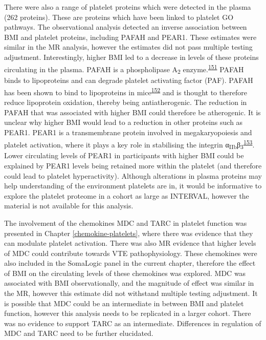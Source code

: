 \documentclass[11pt,twoside]{bristolthesis}
\begin{document}
There were also a range of platelet proteins which were detected in the plasma (262 proteins). These are proteins which have been linked to platelet GO pathways. The observational analysis detected an inverse association between BMI and platelet proteins, including PAFAH and PEAR1. These estimates were similar in the MR analysis, however the estimates did not pass multiple testing adjustment. Interestingly, higher BMI led to a decrease in levels of these proteins circulating in the plasma. PAFAH is a phospholipase A\textsubscript{2} enzyme.\textsuperscript{\protect\hyperlink{ref-Marathe2018}{151}} PAFAH binds to lipoproteins and can degrade platelet activating factor (PAF). PAFAH has been shown to bind to lipoproteins in mice\textsuperscript{\protect\hyperlink{ref-Noto2003}{152}} and is thought to therefore reduce lipoprotein oxidation, thereby being antiatherogenic. The reduction in PAFAH that was associated with higher BMI could therefore be atherogenic. It is unclear why higher BMI would lead to a reduction in other proteins such as PEAR1. PEAR1 is a transmembrane protein involved in megakaryopoiesis and platelet activation, where it plays a key role in stabilising the integrin α\textsubscript{IIb}β\textsubscript{3}\textsuperscript{\protect\hyperlink{ref-Kauskot2012}{153}}. Lower circulating levels of PEAR1 in participants with higher BMI could be explained by PEAR1 levels being retained more within the platelet (and therefore could lead to platelet hyperactivity). Although alterations in plasma proteins may help understanding of the environment platelets are in, it would be informative to explore the platelet proteome in a cohort as large as INTERVAL, however the material is not available for this analysis.

The involvement of the chemokines MDC and TARC in platelet function was presented in Chapter \ref{chemokine-platelets}, where there was evidence that they can modulate platelet activation. There was also MR evidence that higher levels of MDC could contribute towards VTE pathophysiology. These chemokines were also included in the SomaLogic panel in the current chapter, therefore the effect of BMI on the circulating levels of these chemokines was explored. MDC was associated with BMI observationally, and the magnitude of effect was similar in the MR, however this estimate did not withstand multiple testing adjustment. It is possible that MDC could be an intermediate in between BMI and platelet function, however this analysis needs to be replicated in a larger cohort. There was no evidence to support TARC as an intermediate. Differences in regulation of MDC and TARC need to be further elucidated.
\end{document}
